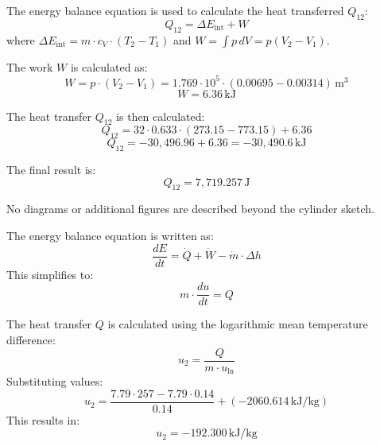 The energy balance equation is used to calculate the heat transferred \( Q_{12} \):  
\[
Q_{12} = \Delta E_{\text{int}} + W
\]  
where \( \Delta E_{\text{int}} = m \cdot c_V \cdot (T_2 - T_1) \) and \( W = \int p \, dV = p(V_2 - V_1) \).  

The work \( W \) is calculated as:  
\[
W = p \cdot (V_2 - V_1) = 1.769 \cdot 10^5 \cdot (0.00695 - 0.00314) \, \text{m}^3
\]  
\[
W = 6.36 \, \text{kJ}
\]  

The heat transfer \( Q_{12} \) is then calculated:  
\[
Q_{12} = 32 \cdot 0.633 \cdot (273.15 - 773.15) + 6.36
\]  
\[
Q_{12} = -30,496.96 + 6.36 = -30,490.6 \, \text{kJ}
\]  

The final result is:  
\[
Q_{12} = 7,719.257 \, \text{J}
\]  

No diagrams or additional figures are described beyond the cylinder sketch.

The energy balance equation is written as:  
\[
\frac{dE}{dt} = \dot{Q} + \dot{W} - \dot{m} \cdot \Delta h
\]  
This simplifies to:  
\[
m \cdot \frac{du}{dt} = Q
\]  

The heat transfer \( Q \) is calculated using the logarithmic mean temperature difference:  
\[
u_2 = \frac{Q}{m \cdot u_{\text{ln}}}
\]  
Substituting values:  
\[
u_2 = \frac{7.79 \cdot 257 - 7.79 \cdot 0.14}{0.14} + (-2060.614 \, \text{kJ/kg})
\]  
This results in:  
\[
u_2 = -192.300 \, \text{kJ/kg}
\]